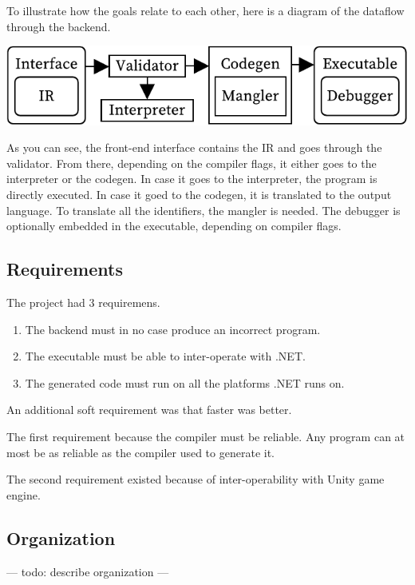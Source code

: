 To illustrate how the goals relate to each other, here is a diagram of the dataflow through the backend.

\includegraphics[width=\columnwidth]{overview}

As you can see, the front-end interface contains the IR and goes through the validator.
From there, depending on the compiler flags, it either goes to the interpreter or the codegen.
In case it goes to the interpreter, the program is directly executed.
In case it goed to the codegen, it is translated to the output language.
To translate all the identifiers, the mangler is needed.
The debugger is optionally embedded in the executable, depending on compiler flags.

\subsection{Requirements}

The project had 3 requiremens.
\begin{enumerate}
    \item The backend must in no case produce an incorrect program.
    \item The executable must be able to inter-operate with .NET.
    \item The generated code must run on all the platforms .NET runs on.
\end{enumerate}
An additional soft requirement was that faster was better.

The first requirement  because the compiler must be reliable.
Any program can at most be as reliable as the compiler used to generate it.

The second requirement existed because of inter-operability with Unity game engine.


\subsection{Organization}
--- todo: describe organization ---

